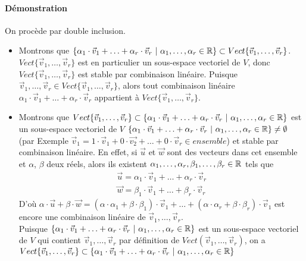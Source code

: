 \paragraph{Démonstration} On procède par double inclusion.
\begin{itemize}
  \item Montrons que $\{\alpha_1 \cdot \vec{v}_1 + \ldots + \alpha_r \cdot \vec{v}_r ~ | ~ \alpha_1, \ldots, \alpha_r \in \mathbb{R} \} \subset Vect\{\vec{v}_1, \ldots, \vec{v}_r\}$. $Vect\{\vec{v}_1, \ldots, \vec{v}_r\}$ est en particulier un sous-espace vectoriel de $V$, donc $Vect\{\vec{v}_1, \ldots, \vec{v}_r\}$ est stable par combinaison linéaire. Puisque $\vec{v}_1, \ldots, \vec{v}_r \in Vect\{\vec{v}_1, \ldots, \vec{v}_r\}$, alors tout combinaison linéaire $\alpha_1 \cdot \vec{v}_1 + \ldots + \alpha_r \cdot \vec{v}_r$ appartient à $Vect\{\vec{v}_1, \ldots, \vec{v}_r\}$.%
  
  \item Montrons que $Vect\{\vec{v}_1, \ldots, \vec{v}_r\} \subset \{\alpha_1 \cdot \vec{v}_1 + \ldots + \alpha_r \cdot \vec{v}_r ~ | ~ \alpha_1, \ldots, \alpha_r \in \mathbb{R} \}$ est un sous-espace vectoriel de $V$ $\{\alpha_1 \cdot \vec{v}_1 + \ldots + \alpha_r \cdot \vec{v}_r ~ | ~ \alpha_1, \ldots, \alpha_r \in \mathbb{R} \} \neq \emptyset$ (par Exemple $\vec{v}_1 = 1 \cdot \vec{v}_1 + 0 \cdot \vec{v_2} + \ldots + 0 \cdot \vec{v}_r \in ensemble$) et stable par combinaison linéaire. En effet, si $\vec{u}$ et $\vec{w}$ sont des vecteurs dans cet ensemble et $\alpha$, $\beta$ deux réels, alors ils existent $\alpha_1, \ldots, \alpha_r, \beta_1, \ldots, \beta_r \in \mathbb{R}$ tels que
    \begin{eqnarray*}
      \vec{u} = \alpha_1 \cdot \vec{v}_1 + \ldots + \alpha_r \cdot \vec{v}_r \\
      \vec{w} = \beta_1 \cdot \vec{v}_1 + \ldots + \beta_r \cdot \vec{v}_r
    \end{eqnarray*}
    D'où $\alpha \cdot \vec{u} + \beta \cdot \vec{w} = (\alpha \cdot \alpha_1 + \beta \cdot \beta_1)\cdot \vec{v}_1 + \ldots + (\alpha \cdot \alpha_r + \beta \cdot \beta_r)\cdot \vec{v}_1$ est encore une combinaison linéaire de $\vec{v}_1, \ldots, \vec{v}_r$. \\
    Puisque $\{\alpha_1 \cdot \vec{v}_1 + \ldots + \alpha_r \cdot \vec{v}_r ~ | ~ \alpha_1, \ldots, \alpha_r \in \mathbb{R} \}$ est un sous-espace vectoriel de $V$ qui contient $\vec{v}_1, \ldots, \vec{v}_r$ par définition de $Vect(\vec{v}_1, \ldots, \vec{v}_r)$, on a $Vect\{\vec{v}_1, \ldots, \vec{v}_r\} \subset \{\alpha_1 \cdot \vec{v}_1 + \ldots + \alpha_r \cdot \vec{v}_r ~ | ~ \alpha_1, \ldots, \alpha_r \in \mathbb{R} \}$
\end{itemize}

